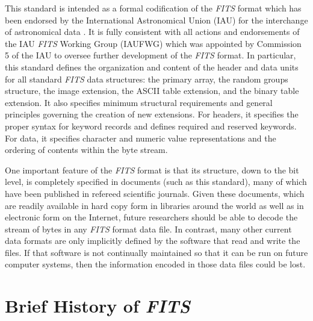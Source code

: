 \documentclass[11pt,makeidx]{book}     %
\begin{document}
   This standard is intended as a  formal codification of the {\em
   FITS\/} format  which has been  endorsed by the International
   Astronomical Union (IAU) for the interchange of astronomical
   data \cite{iau83}. It is fully  consistent with all actions and endorsements of
   the  IAU {\em FITS\/} Working Group (IAUFWG) which was
   appointed by Commission 5 of the IAU to oversee further development of
   the  {\em FITS\/} format.   In particular, this standard defines the
   organization and content  of the header and data units for all 
   standard {\em FITS\/} data structures: the primary array, the random
   groups structure,  the image  extension, the  ASCII table extension,
   and the binary table extension.   It also specifies minimum  structural
   requirements and general principles governing the creation of new
   extensions.   For headers, it specifies the  proper syntax for keyword
   records and defines   required and  reserved keywords.  For
   data, it specifies character and numeric value representations and the
   ordering  of contents within the byte stream.  

   One important feature of the {\em FITS\/} format is that its structure,
   down to the bit level, is completely specified in documents (such as
   this standard), many of which have been published in refereed scientific
   journals.  Given these documents, which are readily  available in hard
   copy form in libraries around the world as well as in electronic form
   on the Internet, future researchers should be able to decode the stream
   of bytes in any {\em FITS\/} format data file.  In contrast, many other current
   data formats are only implicitly defined by the software that read and
   write the files.  If that software is not continually maintained so
   that it can be run on future computer systems, then the information
   encoded in those data files could be lost.

\section{Brief History of {\em FITS}}
\end{document}
